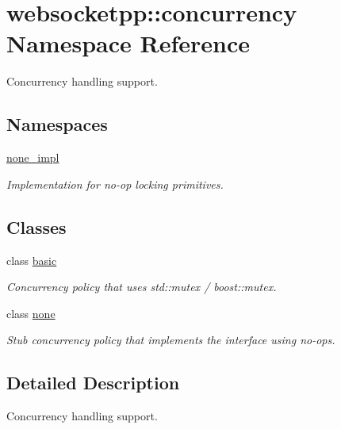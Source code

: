 \hypertarget{namespacewebsocketpp_1_1concurrency}{}\section{websocketpp\+:\+:concurrency Namespace Reference}
\label{namespacewebsocketpp_1_1concurrency}


Concurrency handling support.  


\subsection*{Namespaces}
\begin{DoxyCompactItemize}
\item 
 \mbox{\hyperlink{namespacewebsocketpp_1_1concurrency_1_1none__impl}{none\+\_\+impl}}
\begin{DoxyCompactList}\small\item\em Implementation for no-\/op locking primitives. \end{DoxyCompactList}\end{DoxyCompactItemize}
\subsection*{Classes}
\begin{DoxyCompactItemize}
\item 
class \mbox{\hyperlink{classwebsocketpp_1_1concurrency_1_1basic}{basic}}
\begin{DoxyCompactList}\small\item\em Concurrency policy that uses std\+::mutex / boost\+::mutex. \end{DoxyCompactList}\item 
class \mbox{\hyperlink{classwebsocketpp_1_1concurrency_1_1none}{none}}
\begin{DoxyCompactList}\small\item\em Stub concurrency policy that implements the interface using no-\/ops. \end{DoxyCompactList}\end{DoxyCompactItemize}


\subsection{Detailed Description}
Concurrency handling support. 